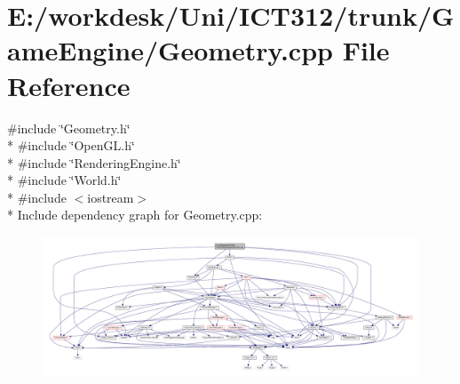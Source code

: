 \section{E\+:/workdesk/\+Uni/\+I\+C\+T312/trunk/\+Game\+Engine/\+Geometry.cpp File Reference}
\label{_geometry_8cpp}
{\ttfamily \#include \char`\"{}Geometry.\+h\char`\"{}}\\*
{\ttfamily \#include \char`\"{}Open\+G\+L.\+h\char`\"{}}\\*
{\ttfamily \#include \char`\"{}Rendering\+Engine.\+h\char`\"{}}\\*
{\ttfamily \#include \char`\"{}World.\+h\char`\"{}}\\*
{\ttfamily \#include $<$iostream$>$}\\*
Include dependency graph for Geometry.\+cpp\+:
\nopagebreak
\begin{figure}[H]
\begin{center}
\leavevmode
\includegraphics[width=350pt]{d2/d88/_geometry_8cpp__incl}
\end{center}
\end{figure}
